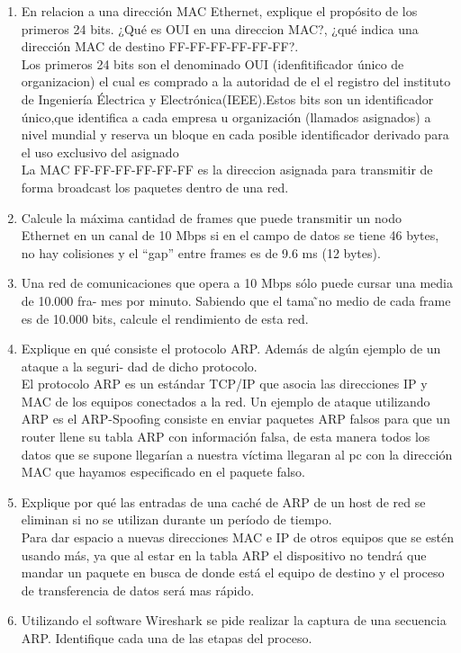 \documentclass{udparticle}
\begin{document}
\begin{enumerate}
    \item En relacion a una dirección MAC Ethernet, explique el propósito de los primeros 24 bits. ¿Qué es OUI en una direccion MAC?,
    ¿qué indica una dirección MAC de destino FF-FF-FF-FF-FF-FF?.\\
    Los primeros 24 bits son el denominado OUI (idenfitificador único de organizacion) el cual es comprado a la autoridad de el 
    el registro del instituto de Ingeniería Électrica y Electrónica(IEEE).Estos bits son un  identificador único,que identifica a 
    cada empresa u organización (llamados asignados) a nivel mundial y reserva un bloque en cada posible identificador derivado para 
    el uso exclusivo del asignado\\
    La  MAC FF-FF-FF-FF-FF-FF es la direccion asignada para transmitir de forma broadcast los paquetes dentro de una red.\\
    \item Calcule la máxima cantidad de frames que puede transmitir un nodo Ethernet en un canal de 10
    Mbps si en el campo de datos se tiene 46 bytes, no hay colisiones y el “gap” entre frames es de
    9.6 ms (12 bytes).\\
    \item Una red de comunicaciones que opera a 10 Mbps sólo puede cursar una media de 10.000 fra-
    mes por minuto. Sabiendo que el tama ̃no medio de cada frame es de 10.000 bits, calcule el
    rendimiento de esta red.\\
    \item Explique en qué consiste el protocolo ARP. Además de algún ejemplo de un ataque a la seguri-
    dad de dicho protocolo.\\
    El protocolo ARP es un estándar TCP/IP que asocia las direcciones IP y MAC de los equipos conectados a la red. Un ejemplo de
    ataque utilizando ARP es el ARP-Spoofing consiste en enviar paquetes ARP falsos para que un router llene su tabla ARP con
    información falsa, de esta manera todos los datos que se supone llegarían a nuestra víctima llegaran al pc con la dirección MAC
    que hayamos especificado en el paquete falso.\\
    \item Explique por qué las entradas de una caché de ARP de un host de red se eliminan si no se
    utilizan durante un período de tiempo.\\
    Para dar espacio a nuevas direcciones MAC e IP de otros equipos que se estén usando más, ya que al estar en la tabla ARP el
    dispositivo no tendrá que mandar un paquete en busca de donde está el equipo de destino y el proceso de transferencia de datos
    será mas rápido.\\
    \item Utilizando el software Wireshark se pide realizar la captura de una secuencia ARP. Identifique
    cada una de las etapas del proceso.\\
    

\end{enumerate}
\end{document}

